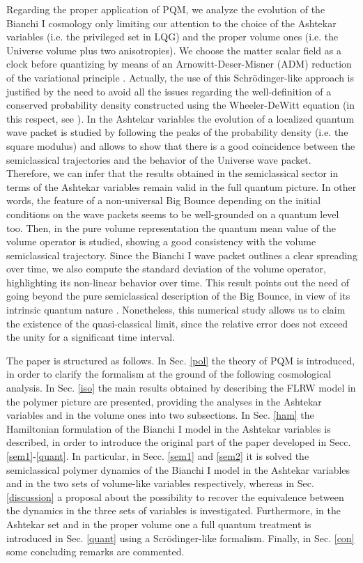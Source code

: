 \documentclass[aps,prd,twocolumn,nofootinbib,superscriptaddress]{revtex4-2}
\begin{document}
Regarding the proper application of PQM, we analyze the evolution of the Bianchi I
cosmology only limiting our attention to the choice of the Ashtekar variables (i.e. the privileged set in LQG) and the proper volume ones (i.e. the Universe volume plus two anisotropies). We choose the matter scalar field as a clock before quantizing by means of an Arnowitt-Deser-Misner (ADM) reduction of the variational principle \cite{ADM}. Actually, the use of this Schr\"{o}dinger-like approach is justified by the need to avoid all the issues regarding the well-definition of a conserved probability density constructed using the Wheeler-DeWitt equation (in this respect, see \cite{shell,rosenstein1985probability}). In the Ashtekar variables the evolution of a localized quantum wave packet is studied by following the peaks of the probability density (i.e. the square modulus) and allows to show that there is a good coincidence between the semiclassical trajectories and the behavior of the Universe wave packet. Therefore, we can infer that the results obtained in the semiclassical sector in
terms of the Ashtekar variables remain valid in the full quantum picture. In other words, the feature of a non-universal Big Bounce depending on the initial conditions on the wave packets seems to be well-grounded on a quantum level too. Then, in the pure volume representation the quantum mean value of the volume operator is studied, showing a good consistency with the volume semiclassical trajectory. Since the Bianchi I wave packet outlines a clear spreading over time, we also compute the standard deviation of the volume operator, highlighting its non-linear behavior over time. This result points out the need of going beyond the pure semiclassical description of the Big Bounce, in view of its intrinsic quantum nature \cite{B2020}. Nonetheless, this numerical study allows us to claim the existence of the quasi-classical limit, since the relative error does not exceed the unity for a significant time interval.

The paper is structured as follows. In Sec. \ref{pol} the theory of PQM is introduced, in order to clarify the formalism at the ground of the following cosmological analysis. In Sec. \ref{iso} the main results obtained by describing the FLRW model in the polymer picture are presented, providing the analyses in the Ashtekar variables and in the volume ones into two subsections. In Sec. \ref{ham} the Hamiltonian formulation of the Bianchi I model in the Ashtekar variables is described, in order to introduce the original part of the paper developed in Secc. \ref{sem1}-\ref{quant}. In particular, in Secc. \ref{sem1} and \ref{sem2} it is solved the semiclassical polymer dynamics of the Bianchi I model in the Ashtekar variables and in the two sets of volume-like variables respectively, whereas in Sec. \ref{discussion} a proposal about the possibility to recover the equivalence between the dynamics in the three sets of variables is investigated. Furthermore, in the Ashtekar set and in the proper volume one a full quantum treatment is introduced in Sec. \ref{quant} using a Scr\"{o}dinger-like formalism. Finally, in Sec. \ref{con} some concluding remarks are commented.
		
\end{document}
